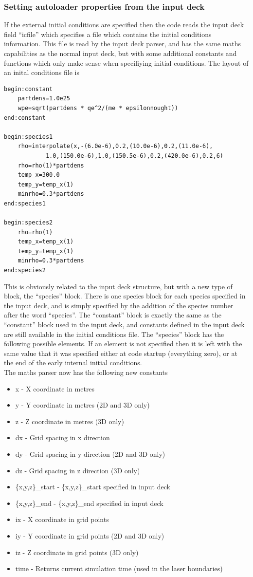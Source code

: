 \documentclass[12pt]{article}
\begin{document}
\subsubsection{Setting autoloader properties from the input deck}
If the external initial conditions are specified then the code reads the input deck field ``icfile'' which specifies a file which contains the initial conditions information. This file is read by the input deck parser, and has the same maths capabilities as the normal input deck, but with some additional constants and functions which only make sense when specifiying initial conditions. The layout of an inital conditions file is
\begin{verbatim}
begin:constant
	partdens=1.0e25
	wpe=sqrt(partdens * qe^2/(me * epsilonnought))
end:constant

begin:species1
	rho=interpolate(x,-(6.0e-6),0.2,(10.0e-6),0.2,(11.0e-6),
            1.0,(150.0e-6),1.0,(150.5e-6),0.2,(420.0e-6),0.2,6)
	rho=rho(1)*partdens
	temp_x=300.0
	temp_y=temp_x(1)
	minrho=0.3*partdens
end:species1

begin:species2
	rho=rho(1)
	temp_x=temp_x(1)
	temp_y=temp_x(1)
	minrho=0.3*partdens
end:species2
\end{verbatim}
This is obviously related to the input deck structure, but with a new type of block, the ``species'' block. There is one species block for each species specified in the input deck, and is simply specified by the addition of the species number after the word ``species''. The ``constant'' block is exactly the same as the ``constant'' block used in the input deck, and constants defined in the input deck are still available in the initial conditions file. The ``species'' block has the following possible elements. If an element is not specified then it is left with the same value that it was specified either at code startup (everything zero), or at the end of the early internal initial conditions.\\
The maths parser now has the following new constants
\begin{itemize}
\item x - X coordinate in metres
\item y - Y coordinate in metres (2D and 3D only)
\item z - Z coordinate in metres (3D only)
\item dx - Grid spacing in x direction
\item dy - Grid spacing in y direction (2D and 3D only)
\item dz - Grid spacing in z direction (3D only)
\item \{x,y,z\}\_start - \{x,y,z\}\_start specified in input deck
\item \{x,y,z\}\_end - \{x,y,z\}\_end specified in input deck
\item ix - X coordinate in grid points
\item iy - Y coordinate in grid points (2D and 3D only)
\item iz - Z coordinate in grid points (3D only)
\item time - Returns current simulation time (used in the laser boundaries)
\end{itemize}
\end{document}
